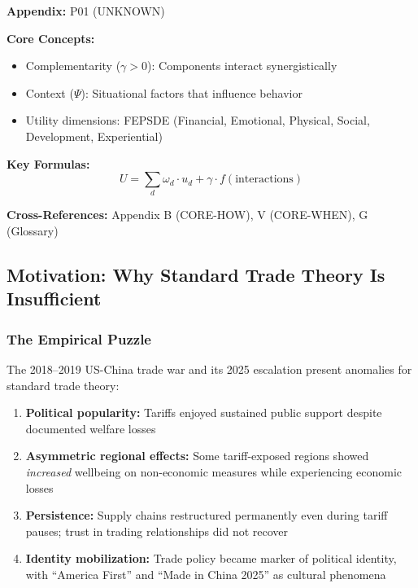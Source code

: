 \begin{tcolorbox}[colback=blue!5!white, colframe=blue!75!black,
    title=Quick Reference: Unknown]

\textbf{Appendix:} P01 (UNKNOWN)

\textbf{Core Concepts:}
\begin{itemize}[nosep]
\item Complementarity ($\gamma > 0$): Components interact synergistically
\item Context ($\Psi$): Situational factors that influence behavior
\item Utility dimensions: FEPSDE (Financial, Emotional, Physical, Social, Development, Experiential)
\end{itemize}

\textbf{Key Formulas:}
\begin{equation}
U = \sum_d \omega_d \cdot u_d + \gamma \cdot f(\text{interactions})
\end{equation}

\textbf{Cross-References:} Appendix B (CORE-HOW), V (CORE-WHEN), G (Glossary)
\end{tcolorbox}

\subsection{Motivation: Why Standard Trade Theory Is Insufficient}

\subsubsection{The Empirical Puzzle}

The 2018--2019 US-China trade war and its 2025 escalation present anomalies 
for standard trade theory:

\begin{enumerate}
    \item \textbf{Political popularity:} Tariffs enjoyed sustained public support 
    despite documented welfare losses \citep{amiti2019impact, fajgelbaum2020return}
    
    \item \textbf{Asymmetric regional effects:} Some tariff-exposed regions showed 
    \emph{increased} wellbeing on non-economic measures while experiencing economic losses
    
    \item \textbf{Persistence:} Supply chains restructured permanently even during 
    tariff pauses; trust in trading relationships did not recover
    
    \item \textbf{Identity mobilization:} Trade policy became marker of political 
    identity, with ``America First'' and ``Made in China 2025'' as cultural phenomena
\end{enumerate}

